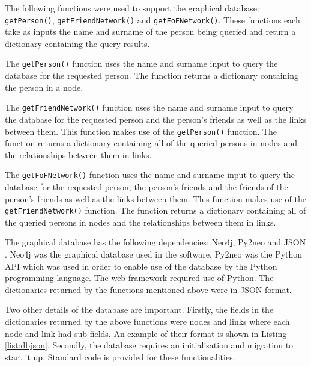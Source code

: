 \documentclass[12pt,onecolumn]{article}
\begin{document}
	The following functions were used to support the graphical database: \texttt{getPerson()}, \texttt{getFriendNetwork()} and \texttt{getFoFNetwork()}. These functions each take as inputs the name and surname of the person being queried and return a dictionary containing the query results. 
	
	The \texttt{getPerson()} function uses the name and surname input to query the database for the requested person. The function returns a dictionary containing the person in a node.
	
	The \texttt{getFriendNetwork()} function uses the name and surname input to query the database for the requested person and the person's friends as well as the links between them. This function makes use of the \texttt{getPerson()} function. The function returns a dictionary containing all of the queried persons in nodes and the relationships between them in links.
	
	The \texttt{getFoFNetwork()} function uses the name and surname input to query the database for the requested person, the person's friends and the friends of the person's friends as well as the links between them. This function makes use of the \texttt{getFriendNetwork()} function. The function returns a dictionary containing all of the queried persons in nodes and the relationships between them in links.
	
	The graphical database has the following dependencies: Neo4j, Py2neo and JSON \cite{neo4j, py2neo, JSON}. Neo4j was the graphical database used in the software. Py2neo was the Python API which was used in order to enable use of the database by the Python programming language. The web framework required use of Python. The dictionaries returned by the functions mentioned above were in JSON format.
	
	Two other details of the database are important. Firstly, the fields in the dictionaries returned by the above functions were nodes and links where each node and link had sub-fields. An example of their format is shown in Listing \ref{list:dbjson}. Secondly, the database requires an initialisation and migration to start it up. Standard code is provided for these functionalities.
	
\end{document}
